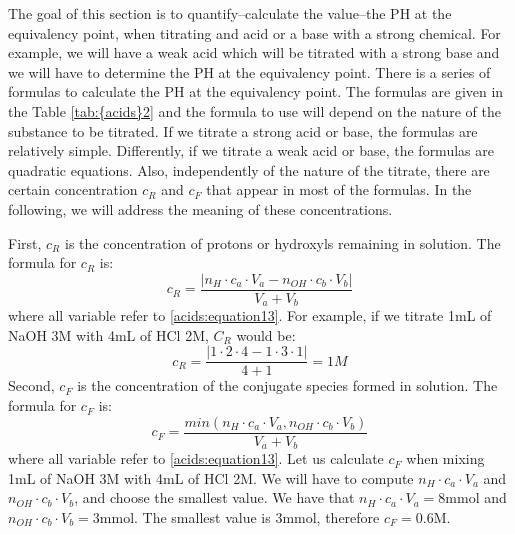 \documentclass[main.tex]{subfiles}
\newcommand\chapterlabel{acids}
\begin{document}
\begin{description}
\begin{minipage}[b]{1.\linewidth}
\begin{center}
\begin{tikzpicture}
\end{tikzpicture}
\end{center}\end{minipage}


\vspace{-9cm}
 \label{tab:{\chapterlabel}2}
\item[\docfilehook{\smallpencil Titration PH formulas}{Titration PH formulas}] The goal of this section is to quantify--calculate the value--the PH at the equivalency point, when titrating and acid or a base with a strong chemical. For example, we will have a weak acid which will be titrated with a strong base and we will have to determine the PH at the equivalency point. There is a series of formulas to calculate the PH at the equivalency point.  The formulas are given in the Table \ref{tab:{\chapterlabel}2} and the formula to use will depend on the nature of the substance to be titrated. If we titrate a strong acid or base, the formulas are relatively simple. Differently, if we titrate a weak acid or base, the formulas are quadratic equations. Also, independently of the nature of the titrate, there are certain concentration $c_R$ and $c_F$ that appear in most of the formulas. In the following, we will address the meaning of these concentrations.
\item[\docfilehook{\smallpencil $c_R$ and $c_F$}{$c_R$ and $c_F$}] First, $c_R$ is the concentration of protons or hydroxyls remaining in solution. The formula for $c_R$ is:
\begin{equation}
\boxed{c_R=\frac{\rvert n_{H}\cdot c_a\cdot V_a -n_{OH}\cdot c_b\cdot V_b \lvert}{V_a+V_b} }
\label{\chapterlabel:equation14}
 \end{equation} 
 where all variable refer to \ref{\chapterlabel:equation13}. For example, if we titrate 1mL of NaOH 3M with 4mL of HCl 2M, $C_R$ would be:
 \[c_R=\frac{\rvert 1\cdot 2\cdot 4 -1\cdot 3\cdot 1 \lvert}{4+1}=1M\]
 Second, $c_F$ is the concentration of the conjugate species formed in solution. The formula for $c_F$ is:
\begin{equation}
\boxed{c_F=\frac{min( n_{H}\cdot c_a\cdot V_a , n_{OH}\cdot c_b\cdot V_b )}{V_a+V_b} }
\label{\chapterlabel:equation15}
 \end{equation} 
 where all variable refer to \ref{\chapterlabel:equation13}. Let us calculate $c_F$ when mixing 1mL of NaOH 3M with 4mL of HCl 2M. We will have to compute $n_{H}\cdot c_a\cdot V_a$ and $n_{OH}\cdot c_b\cdot V_b$, and choose the smallest value. We have that $n_{H}\cdot c_a\cdot V_a=8$mmol and $n_{OH}\cdot c_b\cdot V_b=3$mmol. The smallest value is 3mmol, therefore $c_F=0.6$M.



\end{description}
\end{document}

